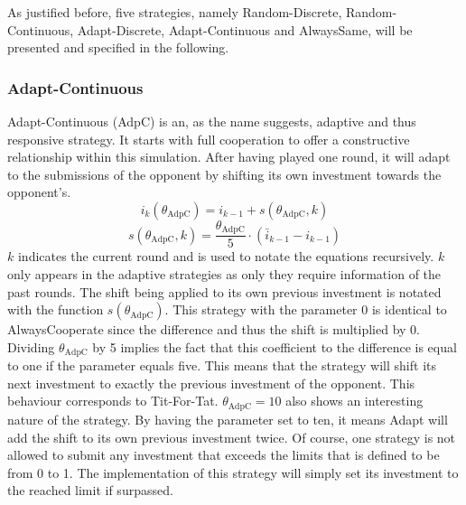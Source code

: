\documentclass[11pt]{article}
\begin{document}
As justified before, five strategies, namely Random-Discrete, Random-Continuous, Adapt-Discrete, Adapt-Continuous and AlwaysSame, will be presented and specified in the following.
	
\subsubsection*{Adapt-Continuous}
Adapt-Continuous (AdpC) is an, as the name suggests, adaptive and thus responsive strategy.
It starts with full cooperation to offer a constructive relationship within this simulation.
After having played one round, it will adapt to the submissions of the opponent by shifting its own investment towards the opponent's.
$$i_k(\theta_{\mathrm{AdpC}}) = i_{k-1} + s(\theta_{\mathrm{AdpC}}, k)$$
$$s(\theta_{\mathrm{AdpC}}, k) = \frac{\theta_{\mathrm{AdpC}}}{5} \cdot (\bar i_{k-1} - i_{k-1})$$
$k$ indicates the current round and is used to notate the equations recursively.
$k$ only appears in the adaptive strategies as only they require information of the past rounds.
The shift being applied to its own previous investment is notated with the function $s(\theta_{\mathrm{AdpC}})$.
This strategy with the parameter 0 is identical to AlwaysCooperate since the difference and thus the shift is multiplied by 0.
Dividing $\theta_{\mathrm{AdpC}}$ by 5 implies the fact that this coefficient to the difference is equal to one if the parameter equals five.
This means that the strategy will shift its next investment to exactly the previous investment of the opponent.
This behaviour corresponds to Tit-For-Tat.
$\theta_{\mathrm{AdpC}} = 10$ also shows an interesting nature of the strategy.
By having the parameter set to ten, it means Adapt will add the shift to its own previous investment twice.
Of course, one strategy is not allowed to submit any investment that exceeds the limits that is defined to be from 0 to 1.
The implementation of this strategy will simply set its investment to the reached limit if surpassed.\\
\end{document}
